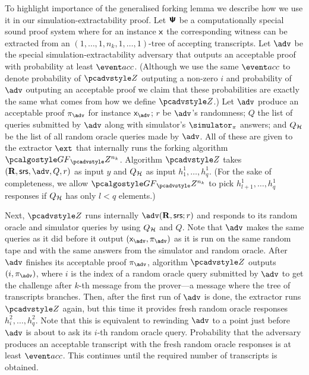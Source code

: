 \documentclass[runningheads,11pt]{llncs}
\begin{document}
To highlight importance of the generalised forking lemma we describe how we use
it in our simulation-extractability proof.  Let $\bm{\mathsf{\Psi}}$ be a
computationally special sound proof system where for an instance $\mathsf{x}$ the
corresponding witness can be extracted from an
$(1, \ldots, 1, n_k, 1, \ldots, 1)$-tree of accepting transcripts.  Let $\advse$
be the special simulation-extractability adversary that outputs an acceptable proof with
probability at least $\accProb$. (Although we use the same $\accProb$ to denote
probability of $\zdv$ outputing a non-zero $i$ and probability of $\advse$
outputing an acceptable proof we claim that these probabilities are exactly the
same what comes from how we define $\zdv$.)  Let $\advse$ produce an acceptable
proof $\zkproof_{\advse}$ for instance $\inp_{\advse}$; $r$ be $\advse$'s
randomness; $Q$ the list of queries submitted by $\advse$ along with simulator's
$\simulator_\zkproof$ answers; and $Q_{\mathcal{H}}$ be the list of all random oracle
queries made by $\advse$.  All of these are given to the extractor $\ext$ that
internally runs the forking algorithm $\genforking_\zdv^{n_k}$.  Algorithm $\zdv$
takes $(\REL, \srs, \advse,
Q, r)$ as input $y$ and $Q_{\mathcal{H}}$ as input $h_1^1, \ldots,
h_q^1$. 
(For the sake of completeness, we allow $\genforking_\zdv^{n_k}$ to
pick $h^1_{l + 1}, \ldots, h^1_q$ responses if $Q_{\mathcal{H}}$ has only $l < q$
elements.)  

Next, $\zdv$ runs internally $\advse(\REL, \srs; r)$ and responds to its random
oracle and simulator queries by using $Q_{\mathcal{H}}$ and $Q$. Note that $\advse$ makes
the same queries as it did before it output $(\inp_{\advse}, \zkproof_{\advse})$
as it is run on the same random tape and with the same answers from the
simulator and random oracle. After $\advse$ finishes its acceptable proof
$\zkproof_{\advse}$, algorithm $\zdv$ outputs $(i, \zkproof_{\advse})$, where
$i$ is the index of a random oracle query submitted by $\advse$ to get the challenge after
$k$-th message from the prover---a message where the tree of transcripts
branches.
Then, after the first run of $\advse$ is done, the extractor runs $\zdv$ again,
but this time it provides fresh random oracle responses $h^2_i, \ldots,
h^2_q$. Note that this is equivalent to rewinding $\advse$ to a point just
before $\advse$ is about to ask its $i$-th random oracle
query. Probability that the adversary produces an acceptable transcript with the
fresh random oracle responses is at least $\accProb$. This continues until the
required number of transcripts is obtained. 
\end{document}
